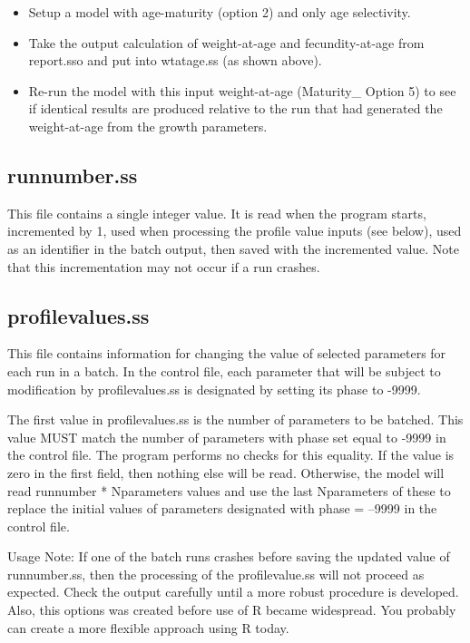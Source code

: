 		\begin{itemize}
			\item Setup a model with age-maturity (option 2) and only age selectivity.
			\item Take the output calculation of weight-at-age and fecundity-at-age  from report.sso and put into wtatage.ss (as shown above).
			\item Re-run the model with this input weight-at-age (Maturity\_ Option 5) to see if identical results are produced relative to the run that had generated the weight-at-age from the growth parameters.
		\end{itemize}


\subsection{runnumber.ss}
This file contains a single integer value. It is read when the program starts, incremented by 1, used when processing the profile value inputs (see below), used as an identifier in the batch output, then saved with the incremented value. Note that this incrementation may not occur if a run crashes.

\subsection{profilevalues.ss}	
This file contains information for changing the value of selected parameters for each run in a batch. In the control file, each parameter that will be subject to modification by profilevalues.ss is designated by setting its phase to -9999.

The first value in profilevalues.ss is the number of parameters to be batched. This value MUST match the number of parameters with phase set equal to -9999 in the control file. The program performs no checks for this equality. If the value is zero in the first field, then nothing else will be read. Otherwise, the model will read runnumber * Nparameters values and use the last Nparameters of these to replace the initial values of parameters designated with phase = --9999 in the control file.

Usage Note: If one of the batch runs crashes before saving the updated value of runnumber.ss, then the processing of the profilevalue.ss will not proceed as expected. Check the output carefully until a more robust procedure is developed. Also, this options was created before use of R became widespread. You probably can create a more flexible approach using R today.


\pagebreak